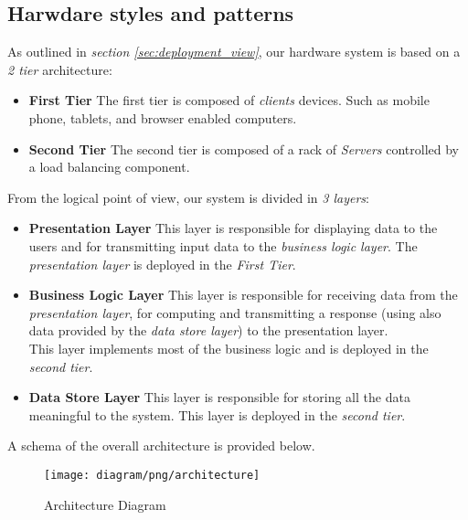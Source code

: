 \subsection{Harwdare styles and patterns} %
\label{sub:harwdare_styles_and_patterns}
As outlined in \emph{section \ref{sec:deployment_view}}, our hardware system is based on a \emph{2 tier} architecture:
\begin{itemize}
	\item \textbf{First Tier} The first tier is composed of \emph{clients} devices. Such as mobile phone, tablets, and browser enabled computers.
	\item \textbf{Second Tier} The second tier is composed of a rack of \emph{Servers} controlled by a load balancing component.
\end{itemize}
From the logical point of view, our system is divided in \emph{3 layers}:
\begin{itemize}
	\item \textbf{Presentation Layer} This layer is responsible for displaying data to the users and for transmitting input data to the \emph{business logic layer}. The \emph{presentation layer} is deployed in the \emph{First Tier}.
	\item \textbf{Business Logic Layer} This layer is responsible for receiving data from the \emph{presentation layer}, for computing and transmitting a response (using also data provided by the \emph{data store layer}) to the presentation layer.\\
	This layer implements most of the business logic and is deployed in the \emph{second tier}.
	\item \textbf{Data Store Layer} This layer is responsible for storing all the data meaningful to the system. This layer is deployed in the \emph{second tier}.
\end{itemize}
A schema of the overall architecture is provided below.
\begin{figure}[h!t]
\caption{Architecture Diagram}
\texttt{[image: diagram/png/architecture]}
\centering
\end{figure}
\newpage




